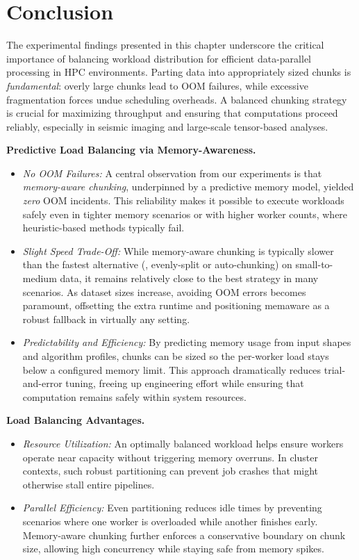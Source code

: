 \section{Conclusion}
\label{sec:idp-conclusion}

The experimental findings presented in this chapter underscore the critical importance of balancing workload distribution for efficient data-parallel processing in \ac{HPC} environments.
Parting data into appropriately sized chunks is \emph{fundamental}: overly large chunks lead to \ac{OOM} failures, while excessive fragmentation forces undue scheduling overheads.
A balanced chunking strategy is crucial for maximizing throughput and ensuring that computations proceed reliably, especially in seismic imaging and large-scale tensor-based analyses.

\vspace{6pt}
\noindent
\textbf{Predictive Load Balancing via Memory-Awareness.}
\begin{itemize}
    \item \emph{No \ac{OOM} Failures:} A central observation from our experiments is that \emph{memory-aware chunking}, underpinned by a predictive memory model, yielded \emph{zero} \ac{OOM} incidents. This reliability makes it possible to execute workloads safely even in tighter memory scenarios or with higher worker counts, where heuristic-based methods typically fail.
    \item \emph{Slight Speed Trade-Off:} While memory-aware chunking is typically slower than the fastest alternative (\eg, evenly-split or auto-chunking) on small-to-medium data, it remains relatively close to the best strategy in many scenarios. As dataset sizes increase, avoiding \ac{OOM} errors becomes paramount, offsetting the extra runtime and positioning memaware as a robust fallback in virtually any setting.
    \item \emph{Predictability and Efficiency:} By predicting memory usage from input shapes and algorithm profiles, chunks can be sized so the per-worker load stays below a configured memory limit. This approach dramatically reduces trial-and-error tuning, freeing up engineering effort while ensuring that computation remains safely within system resources.
\end{itemize}

\vspace{6pt}
\noindent
\textbf{Load Balancing Advantages.}
\begin{itemize}
    \item \textit{Resource Utilization:} An optimally balanced workload helps ensure workers operate near capacity without triggering memory overruns. In cluster contexts, such robust partitioning can prevent job crashes that might otherwise stall entire pipelines.

    \item \textit{Parallel Efficiency:} Even partitioning reduces idle times by preventing scenarios where one worker is overloaded while another finishes early. Memory-aware chunking further enforces a conservative boundary on chunk size, allowing high concurrency while staying safe from memory spikes.
\end{itemize}

